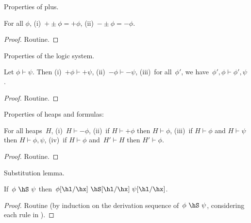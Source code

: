 Properties of plus.
\begin{lemma}
\label{Lemma:plus}
For all $\phi$,
    (i)~$+\pm\phi=+\phi$,
    (ii)~$-\pm\phi=-\phi$.
\end{lemma}
\begin{proof}
Routine.
\end{proof}



Properties of the logic system.
\begin{lemma}
\label{Lemma:logic}
Let $\phi \vdash \psi$.
Then
    (i)~$+\phi \vdash +\psi$,
    (ii)~$-\phi \vdash -\psi$,
    (iii)~for all~$\phi'$, we have~$\phi',\phi \vdash \phi',\psi$.
\end{lemma}
\begin{proof}
Routine.
\end{proof}



Properties of heaps and formulas:
\begin{lemma}
\label{Lemma:heaps}
For all heaps~$H$,
(i)~$H \vdash -\phi$,
(ii)~if $H \vdash +\phi$ then $H \vdash \phi$,
(iii)~if $H \vdash \phi$ and $H \vdash \psi$ then $H \vdash \phi,\psi$,
(iv)~if $H \vdash \phi$ and~$H' \vdash H$ then $H' \vdash \phi$.
\end{lemma}
\begin{proof}
Routine.
\end{proof}


Substitution lemma.
\begin{lemma}
\label{Lemma:substitution}
If~$\phi~\hS~\psi$ then~$\phi[\hl/\hx]~\hS[\hl/\hx]~\psi[\hl/\hx]$.
\end{lemma}
\begin{proof}
Routine (by induction on the derivation sequence of~$\phi~\hS~\psi$, considering each rule in ).
\end{proof}


